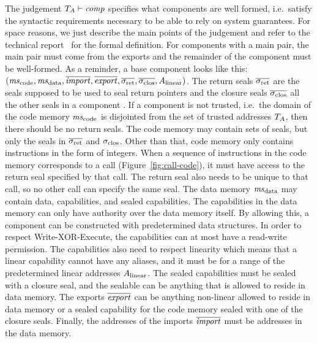 \documentclass[acmsmall,review,anonymous]{acmart}\settopmatter{printfolios=true,printccs=false,printacmref=false}
\renewcommand{\comp}{\var{comp}}
\newcommand{\wdjud}[2][ ]{#1 \vdash #2}
\begin{document}
The judgement $\wdjud[\ta]{\comp}$ specifies what components are well formed, i.e.\ satisfy the syntactic requirements necessary to be able to rely on system guarantees.
For space reasons, we just describe the main points of the judgement and refer to the technical report~\citep{technical_report} for the formal definition.
For components with a main pair, the main pair must come from the exports and the remainder of the component must be well-formed.
As a reminder, a base component looks like this: $(\mscode,\msdata,\overline{\var{import}},\overline{\var{export}},\sigrets,\sigcloss,A_\linear)$.
The return seals $\sigrets$ are the seals supposed to be used to seal return pointers and the closure seals $\sigcloss$ all the other seals in a component .
If a component is not trusted, i.e.\ the domain of the code memory $\mscode$ is disjointed from the set of trusted addresses $T_{A}$, then there should be no return seals.
The code memory may contain sets of seals, but only the seals in $\sigrets$ and $\sigclos$.
Other than that, code memory only contains instructions in the form of integers.
When a sequence of instructions in the code memory corresponds to a call (Figure~\ref{fig:call-code}), it must have access to the return seal specified by that call.
The return seal also needs to be unique to that call, so no other call can specify the same seal.
The data memory $\msdata$ may contain data, capabilities, and sealed capabilities.
The capabilities in the data memory can only have authority over the data memory itself.
By allowing this, a component can be constructed with predetermined data structures.
In order to respect Write-XOR-Execute, the capabilities can at most have a read-write permission.
The capabilities also need to respect linearity which means that a linear capability cannot have any aliases, and it must be for a range of the predetermined linear addresses $A_{\mathrm{linear}}$.
The sealed capabilities must be sealed with a closure seal, and the sealable can be anything that is allowed to reside in data memory.
The exports $\overline{\mathit{export}}$ can be anything non-linear allowed to reside in data memory or a sealed capability for the code memory sealed with one of the closure seals.
Finally, the addresses of the imports $\overline{\mathit{import}}$ must be addresses in the data memory.
\end{document}
